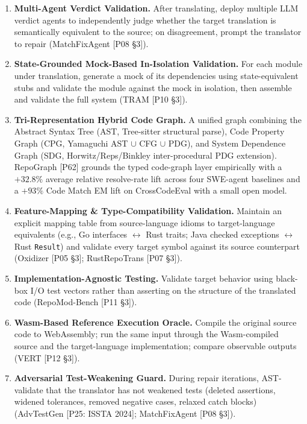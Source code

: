 \begin{enumerate}
\item \textbf{Multi-Agent Verdict Validation.}
After translating, deploy multiple LLM verdict agents to independently judge whether the target translation is semantically equivalent to the source; on disagreement, prompt the translator to repair (MatchFixAgent [P08 \S3]).

\item \textbf{State-Grounded Mock-Based In-Isolation Validation.}
For each module under translation, generate a mock of its dependencies using state-equivalent stubs and validate the module against the mock in isolation, then assemble and validate the full system (TRAM [P10 \S3]).

\item \textbf{Tri-Representation Hybrid Code Graph.}
A unified graph combining the Abstract Syntax Tree (AST, Tree-sitter structural parse), Code Property Graph (CPG, Yamaguchi AST $\cup$ CFG $\cup$ PDG), and System Dependence Graph (SDG, Horwitz/Reps/Binkley inter-procedural PDG extension). RepoGraph [P62] grounds the typed code-graph layer empirically with a $+32.8\%$ average relative resolve-rate lift across four SWE-agent baselines and a $+93\%$ Code Match EM lift on CrossCodeEval with a small open model.

\item \textbf{Feature-Mapping \& Type-Compatibility Validation.}
Maintain an explicit mapping table from source-language idioms to target-language equivalents (e.g., Go interfaces $\leftrightarrow$ Rust traits; Java checked exceptions $\leftrightarrow$ Rust \texttt{Result}) and validate every target symbol against its source counterpart (Oxidizer [P05 \S3]; RustRepoTrans [P07 \S3]).

\item \textbf{Implementation-Agnostic Testing.}
Validate target behavior using black-box I/O test vectors rather than asserting on the structure of the translated code (RepoMod-Bench [P11 \S3]).

\item \textbf{Wasm-Based Reference Execution Oracle.}
Compile the original source code to WebAssembly; run the same input through the Wasm-compiled source and the target-language implementation; compare observable outputs (VERT [P12 \S3]).

\item \textbf{Adversarial Test-Weakening Guard.}
During repair iterations, AST-validate that the translator has not weakened tests (deleted assertions, widened tolerances, removed negative cases, relaxed catch blocks) (AdvTestGen [P25: ISSTA 2024]; MatchFixAgent [P08 \S3]).


\end{enumerate}
